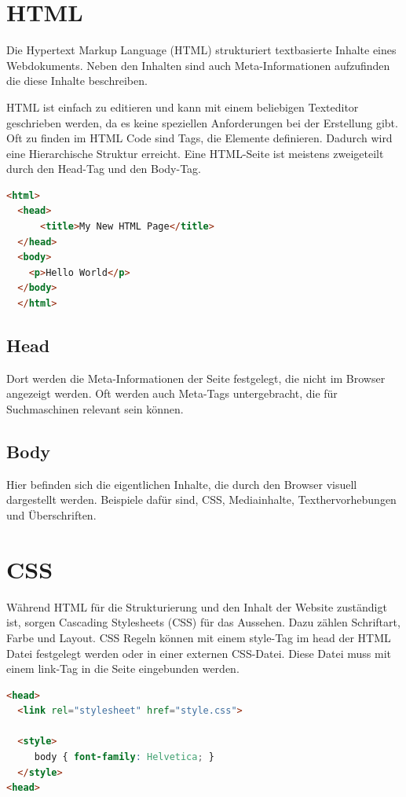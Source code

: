 \clearpage

\section{HTML} \label{HTML}
Die Hypertext Markup Language (HTML) strukturiert textbasierte Inhalte 
eines Webdokuments. Neben den Inhalten sind auch Meta-Informationen aufzufinden
die diese Inhalte beschreiben. 

HTML ist einfach zu editieren und kann mit einem beliebigen Texteditor geschrieben werden, 
da es keine speziellen Anforderungen bei der Erstellung gibt. Oft zu finden im HTML Code
sind Tags, die Elemente definieren. Dadurch wird eine Hierarchische Struktur erreicht.
Eine HTML-Seite ist meistens zweigeteilt durch den Head-Tag und den Body-Tag.
\\

\begin{lstlisting}[language=html, caption=HTML Beispiel]
  <html>
  <head>
      <title>My New HTML Page</title>
  </head>
  <body>
    <p>Hello World</p>
  </body>
  </html>
\end{lstlisting}

\subsection*{Head}
Dort werden die Meta-Informationen der Seite festgelegt, die nicht im Browser 
angezeigt werden. Oft werden auch Meta-Tags untergebracht, die für Suchmaschinen 
relevant sein können. 
\subsection*{Body}
Hier befinden sich die eigentlichen Inhalte, die durch den Browser 
visuell dargestellt werden. Beispiele dafür sind, CSS, Mediainhalte, 
Texthervorhebungen und Überschriften. 
\newpage

\section{CSS}
Während HTML für die Strukturierung und den Inhalt der Website zuständigt ist,
sorgen Cascading Stylesheets (CSS) für das Aussehen. Dazu zählen Schriftart, Farbe und
Layout. 
CSS Regeln können mit einem style-Tag im head der HTML Datei festgelegt werden oder
in einer externen CSS-Datei. Diese Datei muss mit einem link-Tag in die Seite eingebunden
werden. 
\\
\begin{lstlisting}[language=html, caption=HTML Beispiel mit CSS]
  <head>
  <link rel="stylesheet" href="style.css">

  <style>
     body { font-family: Helvetica; }
  </style>
<head>
\end{lstlisting}

